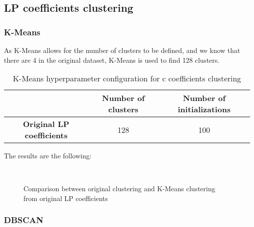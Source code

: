 	\subsection{LP coefficients clustering}

		\subsubsection{K-Means}
			
			As K-Means allows for the number of clusters to be defined, and we know that there are 4 in the original dataset, K-Means is used to find 128 clusters.
			
			\begin{table}[h!]
				\centering
				\begin{tabular}{|c|c|c|}
					\hline
					& \textbf{Number of clusters} & \textbf{Number of initializations}\\
					\hline
					\textbf{Original LP coefficients} & 128 & 100\\
					\hline
				\end{tabular}
				\caption{K-Means hyperparameter configuration for c coefficients clustering}
			\end{table}
		
			The results are the following:
			
			\begin{figure*}[ht!]
				\centering
				\hspace{\fill}
				\\
					
				\hspace{\fill}
				\caption{Comparison between original clustering and K-Means clustering from original LP coefficients}
			\end{figure*}
			\FloatBarrier
		
		\subsubsection{DBSCAN}
			
